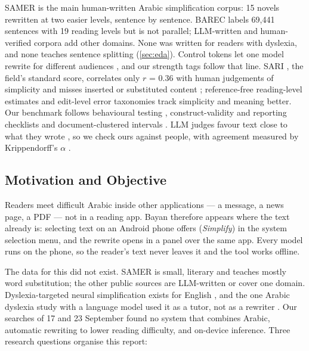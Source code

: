 \documentclass[10pt,a4paper]{article}
\begin{document}
 SAMER \cite{samer} is the main
human-written Arabic simplification corpus: 15 novels rewritten at two easier
levels, sentence by sentence. BAREC \cite{barec} labels 69,441 sentences with 19
reading levels but is not parallel; LLM-written \cite{baseet} and human-verified
\cite{daasi} corpora add other domains. None was written for readers with
dyslexia, and none teaches sentence splitting (\autoref{sec:eda}). Control tokens
let one model rewrite for different audiences \cite{scarton2018,access,muss}, and
our strength tags follow that line. SARI \cite{sari}, the field's standard score,
correlates only $r$ = 0.36 with human judgements of simplicity
\cite{alvamanchego2021} and misses inserted or substituted content
\cite{devaraj2022}; reference-free reading-level estimates \cite{cripwell2023} and
edit-level error taxonomies \cite{salsa} track simplicity and meaning better. Our
benchmark follows behavioural testing \cite{checklist}, construct-validity and
reporting checklists \cite{bean2025,betterbench} and document-clustered intervals
\cite{miller2024}. LLM judges favour text close to what they wrote
\cite{li2026}, so we check ours against people, with agreement measured by
Krippendorff's $\alpha$ \cite{krippendorff}.

\subsection{Motivation and Objective}
\label{sec:objective}

Readers meet difficult Arabic inside other applications --- a message, a news
page, a PDF --- not in a reading app. Bayan therefore appears where the text
already is: selecting text on an Android phone offers 
(\emph{Simplify}) in the system selection menu, and the rewrite opens in a panel
over the same app. Every model runs on the phone, so the reader's text never
leaves it and the tool works offline.

The data for this did not exist. SAMER is small, literary and teaches mostly word
substitution; the other public sources are LLM-written or cover one domain.
Dyslexia-targeted neural simplification exists for English \cite{madjidi2023},
and the one Arabic dyslexia study with a language model used it as a tutor, not
as a rewriter \cite{gharaibeh2025}. Our searches of 17 and 23 September found no
system that combines Arabic, automatic rewriting to lower reading difficulty, and
on-device inference. Three research questions organise this report:
\end{document}
